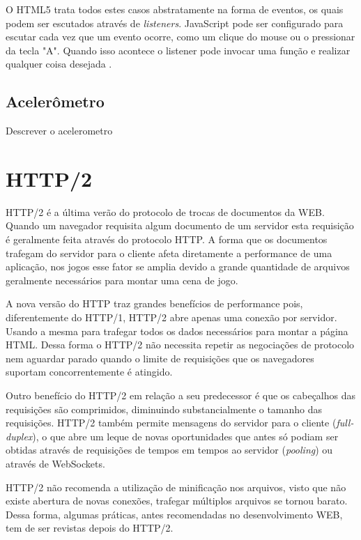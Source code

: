O HTML5 trata todos estes casos abstratamente na forma de eventos, os
quais podem ser escutados através de \textit{listeners}. JavaScript
pode ser configurado para escutar cada vez que um evento ocorre, como
um clique do mouse ou o pressionar da tecla "A". Quando isso acontece o
listener pode invocar uma função e realizar qualquer coisa desejada
\autocite{buildingHtml5Game}.

\subsection{Acelerômetro}
\begin{draft}
    Descrever o acelerometro
\end{draft}
\section{HTTP/2}
HTTP/2 é a última verão do protocolo de trocas de documentos da
WEB. Quando um navegador requisita algum documento de um servidor esta
requisição é geralmente feita através do protocolo HTTP. A forma
que os documentos trafegam do servidor para o cliente afeta diretamente
a performance de uma aplicação, nos jogos esse fator se amplia devido
a grande quantidade de arquivos geralmente necessários para montar uma
cena de jogo.

A nova versão do HTTP traz grandes benefícios de performance
pois, diferentemente do HTTP/1, HTTP/2 abre apenas uma conexão por
servidor. Usando a mesma para trafegar todos os dados necessários para
montar a página HTML. Dessa forma o HTTP/2 não necessita repetir
as negociações de protocolo nem aguardar parado quando o limite de
requisições que os navegadores suportam concorrentemente é atingido.

Outro benefício do HTTP/2 em relação a seu predecessor é que
os cabeçalhos das requisições são comprimidos, diminuindo
substancialmente o tamanho das requisições. HTTP/2 também permite
mensagens do servidor para o cliente (\textit{full-duplex}), o
que abre um leque de novas oportunidades que antes só podiam ser
obtidas através de requisições de tempos em tempos ao servidor
(\textit{pooling}) ou através de WebSockets.

HTTP/2 não recomenda a utilização de minificação nos arquivos,
visto que não existe abertura de novas conexões, trafegar múltiplos
arquivos se tornou barato. Dessa forma, algumas práticas, antes
recomendadas no desenvolvimento WEB, tem de ser revistas depois do
HTTP/2.

